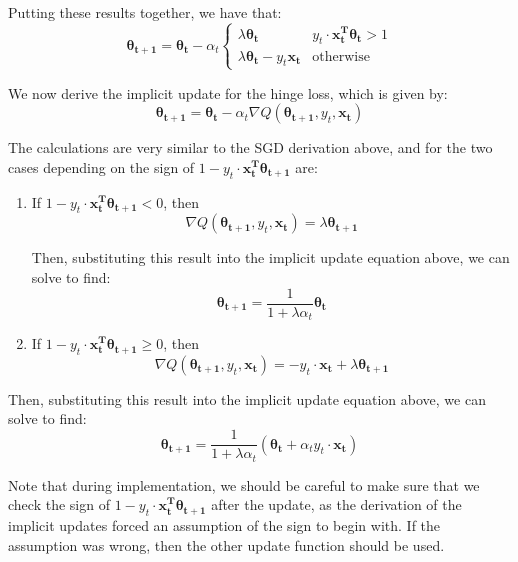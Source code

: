 \documentclass{article}
\renewcommand{\vec}[1]{\boldsymbol{#1}}
\begin{document}
\begin{enumerate}[(a)]
Putting these results together, we have that:
\begin{equation}
\vec{\theta_{t+1}} = \vec{\theta_t} - \alpha_t \left\{ 
	\begin{array}{lr}
		\lambda\vec{\theta_t} &  y_t\cdot\vec{x_t^{T}}\vec{\theta_t} > 1\\
		\lambda\vec{\theta_t} - y_t\vec{x_t} &  \textrm{otherwise}
	\end{array}
\right.
\end{equation}

We now derive the implicit update for the hinge loss, which is given by:
\begin{equation}
\vec{\theta_{t+1}} = \vec{\theta_{t}} - \alpha_{t}\nabla Q(\vec{\theta_{t+1}}, y_t, \vec{x_t})
\end{equation}

The calculations are very similar to the SGD derivation above, and for the two cases depending on the sign of $1-y_t\cdot\vec{x_t^{T}}\vec{\theta_{t+1}}$ are:

\begin{enumerate}[1.]
\item If $1-y_t\cdot\vec{x_t^{T}}\vec{\theta_{t+1}} < 0$, then
\begin{equation*}
\nabla Q(\vec{\theta_{t+1}}, y_t, \vec{x_t}) = \lambda\vec{\theta_{t+1}}
\end{equation*}

Then, substituting this result into the implicit update equation above, we can solve to find:
\begin{equation}
\vec{\theta_{t+1}} = \frac{1}{1+\lambda\alpha_t}\vec{\theta_t}
\end{equation}

\item If $1-y_t\cdot\vec{x_t^{T}}\vec{\theta_{t+1}} \geq 0$, then 
\begin{equation*}
\nabla Q(\vec{\theta_{t+1}}, y_t, \vec{x_t}) = -y_t\cdot\vec{x_t} + \lambda\vec{\theta_{t+1}}
\end{equation*}
\end{enumerate}

Then, substituting this result into the implicit update equation above, we can solve to find:
\begin{equation}
\vec{\theta_{t+1}} = \frac{1}{1+\lambda\alpha_t}\left(\vec{\theta_t} + \alpha_t y_t\cdot\vec{x_t}\right)
\end{equation}

Note that during implementation, we should be careful to make sure that we check the sign of $1-y_t\cdot\vec{x_t^{T}}\vec{\theta_{t+1}}$ after the update, as the derivation of the implicit updates forced an assumption of the sign to begin with. If the assumption was wrong, then the other update function should be used.\\


\end{enumerate}
\end{document}
